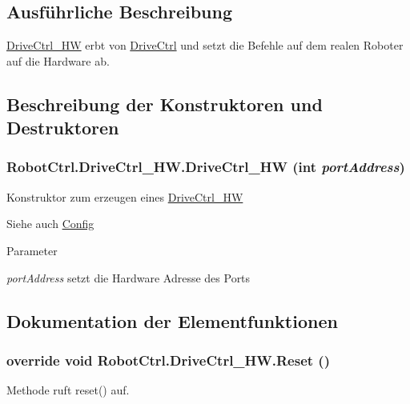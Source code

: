 \subsection{Ausführliche Beschreibung}
\hyperlink{class_robot_ctrl_1_1_drive_ctrl___h_w}{DriveCtrl\_\-HW} erbt von \hyperlink{class_robot_ctrl_1_1_drive_ctrl}{DriveCtrl} und setzt die Befehle auf dem realen Roboter auf die Hardware ab. 

\subsection{Beschreibung der Konstruktoren und Destruktoren}
\hypertarget{class_robot_ctrl_1_1_drive_ctrl___h_w_a35edb9b280ac1c76f0471ce2204f2235}{
\subsubsection[{DriveCtrl\_\-HW}]{\setlength{\rightskip}{0pt plus 5cm}RobotCtrl.DriveCtrl\_\-HW.DriveCtrl\_\-HW (int {\em portAddress})}}
\label{class_robot_ctrl_1_1_drive_ctrl___h_w_a35edb9b280ac1c76f0471ce2204f2235}
Konstruktor zum erzeugen eines \hyperlink{class_robot_ctrl_1_1_drive_ctrl___h_w}{DriveCtrl\_\-HW} \begin{DoxySeeAlso}{Siehe auch}
\hyperlink{class_robot_ctrl_1_1_config}{Config}
\end{DoxySeeAlso}

\begin{DoxyParams}{Parameter}
\item[{\em portAddress}]setzt die Hardware Adresse des Ports \end{DoxyParams}


\subsection{Dokumentation der Elementfunktionen}
\hypertarget{class_robot_ctrl_1_1_drive_ctrl___h_w_a30785a704b5385ea9c41ad87ebb8f61f}{
\subsubsection[{Reset}]{\setlength{\rightskip}{0pt plus 5cm}override void RobotCtrl.DriveCtrl\_\-HW.Reset ()}}
\label{class_robot_ctrl_1_1_drive_ctrl___h_w_a30785a704b5385ea9c41ad87ebb8f61f}
Methode ruft reset() auf. 

